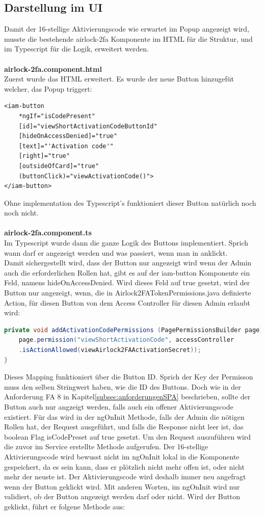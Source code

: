 \subsection{Darstellung im UI}
Damit der 16-stellige Aktivierungscode wie erwartet im Popup angezeigt wird, musste die bestehende airlock-2fa Komponente im HTML für die Struktur, und im Typescript für die Logik, erweitert werden.
\\
\\
\textbf{airlock-2fa.component.html}
\\
Zuerst wurde das HTML erweitert. Es wurde der neue Button hinzugefüt welcher, das Popup triggert:
\begin{lstlisting}
<iam-button
	*ngIf="isCodePresent"
	[id]="viewShortActivationCodeButtonId"
	[hideOnAccessDenied]="true"
	[text]="'Activation code'"
	[right]="true"
	[outsideOfCard]="true"
	(buttonClick)="viewActivationCode()">
</iam-button>
\end{lstlisting}
Ohne implementation des Typescript's funktioniert dieser Button natürlich noch noch nicht.\\
\\
\textbf{airlock-2fa.component.ts}
\\
Im Typescript wurde dann die ganze Logik des Buttons implementiert. Sprich wann darf er angezeigt werden und was passiert, wenn man in anklickt. \\
Damit sichergestellt wird, dass der Button nur angezeigt wird wenn der Admin auch die erforderlichen Rollen hat, gibt es auf der iam-button Komponente ein Feld, namens \flqq hideOnAccessDenied\frqq{}. Wird dieses Feld auf true gesetzt, wird der Button nur angezeigt, wenn, die in Airlock2FATokenPermissions.java definierte Action, für diesen Button von dem Access Controller für diesen Admin erlaubt wird:
\begin{lstlisting}[language=Java]
private void addActivationCodePermissions (PagePermissionsBuilder page) {
	page.permission("viewShortActivationCode", accessController
	.isActionAllowed(viewAirlock2FAActivationSecret));
}
\end{lstlisting}
Dieses Mapping funktioniert über die Button ID. Sprich der Key der Permisson muss den selben Stringwert haben, wie die ID des Buttons. Doch wie in der Anforderung \flqq FA 8\frqq{} in Kapitel\ref{subsec:anforderungenSPA} beschrieben, sollte der Button auch nur angzeigt werden, falls auch ein offener Aktivierungscode existiert. Für das wird in der ngOnInit Methode, falls der Admin die nötigen Rollen hat, der Request ausgeführt, und falls die Response nicht leer ist, das boolean Flag \flqq isCodePreset auf true gesetzt. Um den Request auszuführen wird die zuvor im Service erstellte Methode aufgerufen. Der 16-stellige Aktivierungscode wird bewusst nicht im ngOnInit lokal in die Komponente gespeichert, da es sein kann, dass er plötzlich nicht mehr offen ist, oder nicht mehr der neuste ist. Der Aktivierungscode wird deshalb immer neu angefragt wenn der Button geklickt wird. Mit anderen Worten, im ngOnInit wird nur validiert, ob der Button angezeigt werden darf oder nicht. Wird der Button geklickt, führt er folgene Methode aus:
